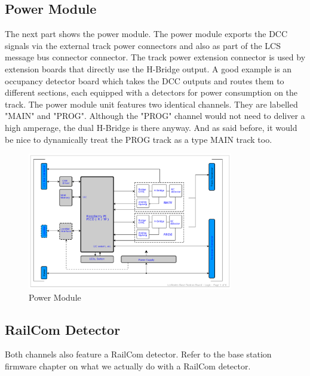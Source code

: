 \subsection{Power Module}

The next part shows the power module. The power module exports the DCC signals via the external track power connectors and also as part of the LCS message bus connector connector. The track power extension connector is used by extension boards that directly use the H-Bridge output. A good example is an occupancy detector board which takes the DCC outputs and routes them to different sections, each equipped with a detectors for power consumption on the track. The power module unit features two identical channels. They are labelled "MAIN" and "PROG". Although the "PROG" channel would not need to deliver a high amperage, the dual H-Bridge is there anyway. And as said before, it would be nice to dynamically treat the PROG track as a type MAIN track too. 

\begin{figure}[htbp]
    \centering
    \includegraphics[page=3, width=0.8\textwidth]{./Schematics/Schematic_LcsNodes-Base-Station-Board.pdf}
    \caption{Power Module}
\end{figure}
\FloatBarrier

\subsection{RailCom Detector}

Both channels also feature a RailCom detector. Refer to the base station firmware chapter on what we actually do with a RailCom detector. 

